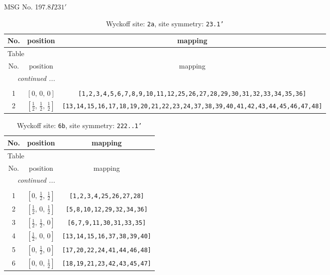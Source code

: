 \documentclass[fleqn,8pt]{jsarticle}
\begin{document}
\setcounter{MaxMatrixCols}{32}

\renewcommand{\tablename}{Table~}
\renewcommand{\figurename}{Figure~}
\begin{center}
\LARGE
MSG No. 197.8\quad$I231'$
\end{center}
\renewcommand{\arraystretch}{1.2}
\begin{longtable}{ccc}
\caption{Wyckoff site: {\tt 2a}, site symmetry: {\tt 23.1'}}
 \\
 \hline \hline
No. & position & mapping \\ \hline \endfirsthead

\multicolumn{2}{l}{\tablename\ \thetable{}} \\
 \hline \hline
No. & position & mapping \\ \hline \endhead

 \hline \hline
\multicolumn{2}{r}{\footnotesize\it continued ...} \\ \endfoot

 \hline \hline
\multicolumn{2}{r}{} \\ \endlastfoot

1 & $\left[ 0,\, 0,\, 0 \right]$ & {\tt [1,2,3,4,5,6,7,8,9,10,11,12,25,26,27,28,29,30,31,32,33,34,35,36]} \\ \hline
2 & $\left[ \frac{1}{2},\, \frac{1}{2},\, \frac{1}{2} \right]$ & {\tt [13,14,15,16,17,18,19,20,21,22,23,24,37,38,39,40,41,42,43,44,45,46,47,48]} \\
\end{longtable}
\renewcommand{\arraystretch}{1.2}
\begin{longtable}{ccc}
\caption{Wyckoff site: {\tt 6b}, site symmetry: {\tt 222..1'}}
 \\
 \hline \hline
No. & position & mapping \\ \hline \endfirsthead

\multicolumn{2}{l}{\tablename\ \thetable{}} \\
 \hline \hline
No. & position & mapping \\ \hline \endhead

 \hline \hline
\multicolumn{2}{r}{\footnotesize\it continued ...} \\ \endfoot

 \hline \hline
\multicolumn{2}{r}{} \\ \endlastfoot

1 & $\left[ 0,\, \frac{1}{2},\, \frac{1}{2} \right]$ & {\tt [1,2,3,4,25,26,27,28]} \\ \hline
2 & $\left[ \frac{1}{2},\, 0,\, \frac{1}{2} \right]$ & {\tt [5,8,10,12,29,32,34,36]} \\ \hline
3 & $\left[ \frac{1}{2},\, \frac{1}{2},\, 0 \right]$ & {\tt [6,7,9,11,30,31,33,35]} \\ \hline
4 & $\left[ \frac{1}{2},\, 0,\, 0 \right]$ & {\tt [13,14,15,16,37,38,39,40]} \\ \hline
5 & $\left[ 0,\, \frac{1}{2},\, 0 \right]$ & {\tt [17,20,22,24,41,44,46,48]} \\ \hline
6 & $\left[ 0,\, 0,\, \frac{1}{2} \right]$ & {\tt [18,19,21,23,42,43,45,47]} \\
\end{longtable}
\end{document}
